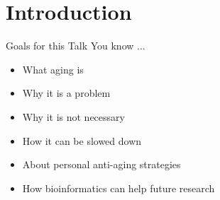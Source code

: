 \section{Introduction}




\begin{frame}[c]{Goals for this Talk}
    \large
    You know ...
    \begin{itemize}[<+(1)->]
        \item What aging is
        \item Why it is a problem
        \item Why it is not necessary
        \item How it can be slowed down
        \item About personal anti-aging strategies
        \item How bioinformatics can help future research
    \end{itemize}
\end{frame}
